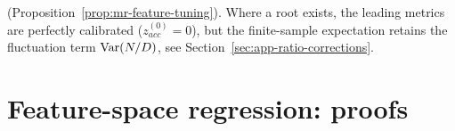 \begin{remark}
\begin{enumerate}
{(Proposition~\ref{prop:mr-feature-tuning}).  Where a root exists, the
leading metrics are perfectly calibrated ($z^{(0)}_{acc}=0$), but the
finite-sample expectation retains the fluctuation term $\mathrm{Var}(N/D)$, see
Section~\ref{sec:app-ratio-corrections}.}
\end{enumerate}
\end{remark}

\section{Feature-space regression: proofs}
\label{sec:app-feature-regression}

